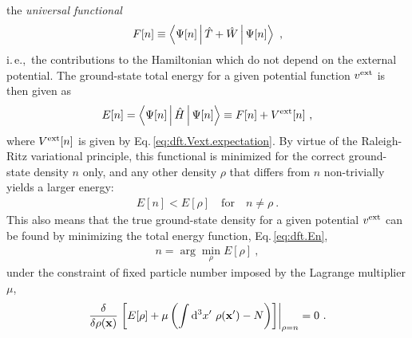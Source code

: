  the \emph{universal functional} 
\begin{align}
	F[n] \equiv \Braket{\Psi [n] | \hat T + \hat W | \Psi [n]}~,
	\label{eq:dft.Fn}
\end{align}
i.\,e.,~the contributions to the Hamiltonian which do not depend on the external potential. The ground-state total energy for a given potential function $v^{\rm ext}$ is then given as
\begin{align}
	E [n] 
		= \Braket{\Psi [n] | \hat H | \Psi [n]}
		\equiv F[n] + V^{\rm ext}[n]~,
	\label{eq:dft.En}
\end{align}
where $V^{\rm ext}[n]$ is given by Eq.\,\eqref{eq:dft.Vext.expectation}.
By virtue of the Raleigh-Ritz variational principle, this functional is minimized for the correct ground-state density $n$ only, and any other density $\rho$ that differs from $n$ non-trivially yields a larger energy:
\begin{align}
	E[n] < E [\rho] \quad \text{for} \quad n \neq \rho~.
\end{align}
This also means that the true ground-state density for a given potential $v^{\rm ext}$ can be found by minimizing the total energy function, Eq.\,\eqref{eq:dft.En},
\begin{align}
	n = \arg \min_{\rho} E[\rho]~,
	\label{eq:dft.n}
\end{align}
under the constraint of fixed particle number imposed by the Lagrange multiplier $\mu$,
\begin{align}
	\frac{\delta}{\delta \rho ({\bf x})}
		\left.\left[ 
			E[\rho] + \mu \left(
				\int \d^3 x' ~ \rho ({\bf x}') - N \right)
		\right]\right\vert_{\rho = n}
		=0~.
		\label{eq:dft.stationarity}
\end{align}

